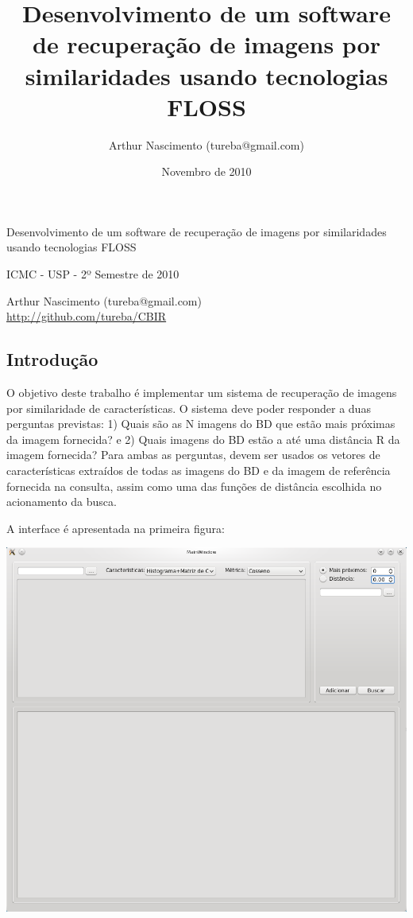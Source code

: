 \documentclass[10pt,a4paper]{article}
\title{Desenvolvimento de um software de recuperação de imagens por similaridades usando tecnologias FLOSS\cite{FLOSS}}
\author{Arthur Nascimento (tureba@gmail.com)}
\date{Novembro de 2010}
\begin{document}
\begin{titlepage}
\begin{center}
{\Large Desenvolvimento de um software de recuperação de imagens por similaridades usando tecnologias FLOSS\cite{FLOSS}}

\vspace*{0.2cm}

{\Large ICMC - USP - 2º Semestre de 2010}

\vspace*{0.2cm}

{\large Arthur Nascimento (tureba@gmail.com)\\\url{http://github.com/tureba/CBIR}}
\end{center}

\tiny

\begin{multicols}{2}
\section{Introdução}

O objetivo deste trabalho é implementar um sistema de recuperação de imagens
por similaridade de características. O sistema deve poder responder a duas
perguntas previstas: 1) Quais são as N imagens do BD que estão mais próximas
da imagem fornecida? e 2) Quais imagens do BD estão a até uma distância R
da imagem fornecida? Para ambas as perguntas, devem ser usados os vetores
de características extraídos de todas as imagens do BD e da imagem de
referência fornecida na consulta, assim como uma das funções de distância
escolhida no acionamento da busca.

A interface é apresentada na primeira figura:

\includegraphics[scale=0.25]{CBIR_inicial.png}



\end{multicols}
\end{titlepage}
\end{document}
